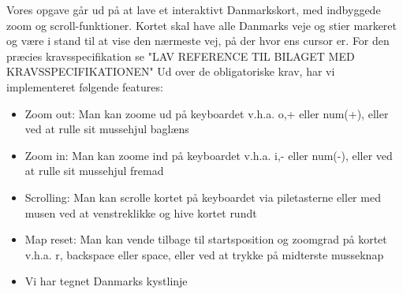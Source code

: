 Vores opgave går ud på at lave et interaktivt Danmarkskort, med indbyggede zoom og scroll-funktioner. Kortet skal have alle Danmarks veje og stier markeret og være i stand til at vise den nærmeste vej, på der hvor ens cursor er. For den præcies kravsspecifikation se "LAV REFERENCE TIL BILAGET MED KRAVSSPECIFIKATIONEN"
\newline
Ud over de obligatoriske krav, har vi implementeret følgende features:
\begin{itemize}
\item{Zoom out: Man kan zoome ud på keyboardet v.h.a. o,+ eller num(+), eller ved at rulle sit mussehjul baglæns}
\item{Zoom in: Man kan zoome ind på keyboardet v.h.a. i,- eller num(-), eller ved at rulle sit mussehjul fremad}
\item{Scrolling: Man kan scrolle kortet på keyboardet via piletasterne eller med musen ved at venstreklikke og hive kortet rundt}
\item{Map reset: Man kan vende tilbage til startsposition og zoomgrad på kortet v.h.a. r, backspace eller space, eller ved at trykke på midterste musseknap}
\item{Vi har tegnet Danmarks kystlinje}
\end{itemize}